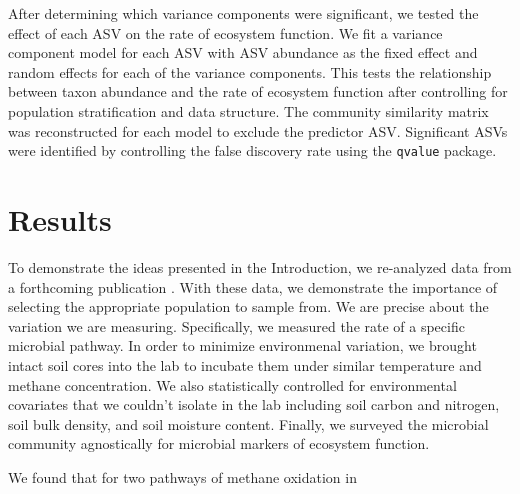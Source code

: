 \documentclass{article}
\begin{document}
After determining which variance components were significant, we tested the
effect of each ASV on the rate of ecosystem function. We fit a variance
component model for each ASV with ASV abundance as the fixed effect and random
effects for each of the variance components. This tests the relationship between
taxon abundance and the rate of ecosystem function after controlling for
population stratification and data structure. The community similarity matrix
was reconstructed for each model to exclude the predictor ASV. 
Significant ASVs were identified by controlling the false discovery rate using
the \texttt{qvalue} package.

\section{Results}

To demonstrate the ideas presented in the Introduction, we re-analyzed data from
a forthcoming publication \citep{meyer2019}. With these data, we demonstrate the
importance of selecting the appropriate population to sample from. We are
precise about the variation we are measuring. Specifically, we measured the rate
of a specific microbial pathway. In order to minimize environmenal variation, we
brought intact soil cores into the lab to incubate them under similar
temperature and methane concentration. We also statistically controlled for
environmental covariates that we couldn't isolate in the lab including soil
carbon and nitrogen, soil bulk density, and soil moisture content. Finally, we
surveyed the microbial community agnostically for microbial markers of ecosystem
function.

We found that for two pathways of methane oxidation in 
\end{document}
